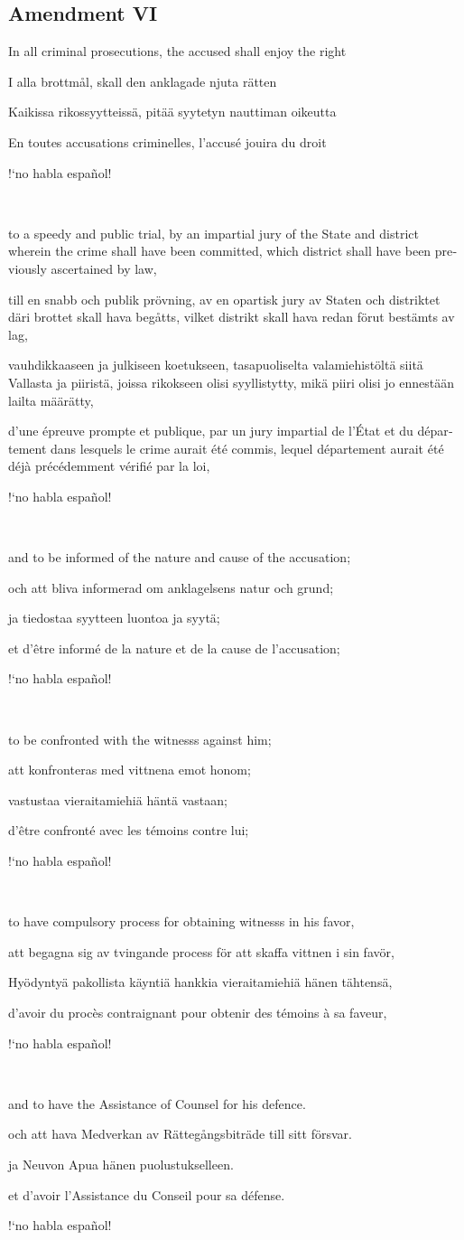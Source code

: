 \documentclass[a4paper,landscape,10pt]{article}
\newcommand{\tblock}[5]{\noindent\begin{minipage}[t]{0.18\textwidth}\foreignlanguage{english}{#1}\end{minipage}\hskip 0.025\textwidth\begin{minipage}[t]{0.18\textwidth}\foreignlanguage{swedish}{#2}\end{minipage}\hskip 0.025\textwidth\begin{minipage}[t]{0.18\textwidth}\foreignlanguage{finnish}{#3}\end{minipage}\hskip 0.025\textwidth\begin{minipage}[t]{0.18\textwidth}\foreignlanguage{french}{#4}\end{minipage}\hskip 0.025\textwidth\begin{minipage}[t]{0.18\textwidth}\foreignlanguage{spanish}{#5}\end{minipage}}
\begin{document}
\subsection*{Amendment VI}
\tblock
{In all criminal prosecutions, the accused shall enjoy the right}
{I alla brottmål, skall den anklagade njuta rätten}
{Kaikissa rikossyytteissä, pitää syytetyn nauttiman oikeutta}
{En toutes accusations criminelles, l'accusé jouira du droit}
{!`no habla español!}

~

\tblock
{to a speedy and public trial, by an impartial jury of the State and district wherein the crime shall have been committed, which district shall have been previously ascertained by law,}
{till en snabb och publik prövning, av en opartisk jury av Staten och distriktet däri brottet skall hava begåtts, vilket distrikt skall hava redan förut bestämts av lag,}
{vauhdikkaaseen ja julkiseen koetukseen, tasapuoliselta valamiehistöltä siitä Vallasta ja piiristä, joissa rikokseen olisi syyllistytty, mikä piiri olisi jo ennestään lailta määrätty,}
{d'une épreuve prompte et publique, par un jury impartial de l'État et du département dans lesquels le crime aurait été commis, lequel département aurait été déjà précédemment vérifié par la loi,}
{!`no habla español!}

~

\tblock
{and to be informed of the nature and cause of the accusation;}
{och att bliva informerad om anklagelsens natur och grund;}
{ja tiedostaa syytteen luontoa ja syytä;}
{et d'être informé de la nature et de la cause de l'accusation;}
{!`no habla español!}

~

\tblock
{to be confronted with the \glspl{witness} against him;}
{att konfronteras med vittnena emot honom;}	
{vastustaa vieraitamiehiä häntä vastaan;}
{d'être confronté avec les témoins contre lui;}
{!`no habla español!}

~

\tblock
{to have compulsory process for obtaining \glspl{witness} in his favor,}
{att begagna sig av tvingande process för att skaffa vittnen i sin favör,}
{Hyödyntyä pakollista käyntiä hankkia vieraitamiehiä hänen tähtensä,}
{d'avoir du procès contraignant pour obtenir des témoins à sa faveur,}
{!`no habla español!}

~

\tblock
{and to have the Assistance of Counsel for his defence.}
{och att hava Medverkan av Rättegångsbiträde till sitt försvar.}
{ja Neuvon Apua hänen puolustukselleen.}
{et d'avoir l'Assistance du Conseil pour sa défense.}
{!`no habla español!}
\end{document}
